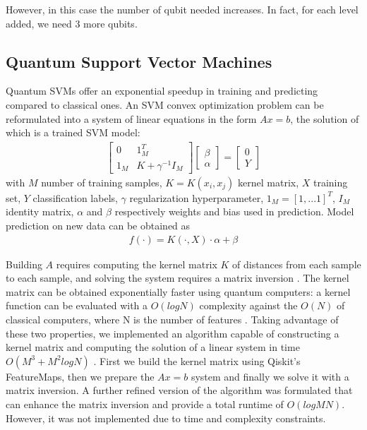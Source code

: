 \documentclass{article}
\begin{document}
\begin{multicols}{2}
However, in this case the number of qubit needed increases. In fact, for each level added, we need 3 more qubits.

\subsection{Quantum Support Vector Machines}
Quantum SVMs offer an exponential speedup in training and predicting compared to classical ones. An SVM convex optimization problem can be reformulated into a system of linear equations in the form \(Ax= b\), the solution of which is a trained SVM model:
\begin{align*}
\begin{bmatrix}
0 & 1^T_M \\
1_M & K+\gamma^{-1}I_M 
\end{bmatrix}
\begin{bmatrix}
\beta \\
\alpha
\end{bmatrix} = 
\begin{bmatrix}
0 \\
Y
\end{bmatrix}
\end{align*}
with $M$ number of training samples, $K=K(x_i,x_j)$ kernel matrix, $X$ training set, $Y$ classification labels, $\gamma$ regularization hyperparameter, $1_M = [1,...1]^T$, $I_M$ identity matrix, $\alpha$ and $\beta$ respectively weights and bias used in prediction.
Model prediction on new data can be obtained as
\begin{align*}
f(\cdot) = K( \cdot,X) \cdot \alpha + \beta
\end{align*}

Building $A$ requires computing the kernel matrix $K$ of distances from each sample to each sample, and solving the system requires a matrix inversion \cite{svm_inversion}. The kernel matrix can be obtained exponentially faster using quantum computers: a kernel function can be evaluated with a \(O(log N)\) complexity against the \(O(N)\) of classical computers, where N is the number of features \cite{Rebentrost2013-ar}.
Taking advantage of these two properties, we implemented an algorithm capable of constructing a kernel matrix and computing the solution of a linear system in time \(O(M^3+ M^2 log N)\) \cite{Havlicek2018-hi}. First we build the kernel matrix using Qiskit’s FeatureMaps, then we prepare the \(Ax = b\) system and finally we solve it with a matrix inversion. A further refined version of the algorithm was formulated that can enhance the matrix inversion and provide a total runtime of \(O(log MN)\). However, it was not implemented due to time and complexity constraints.


\end{multicols}
\end{document}
